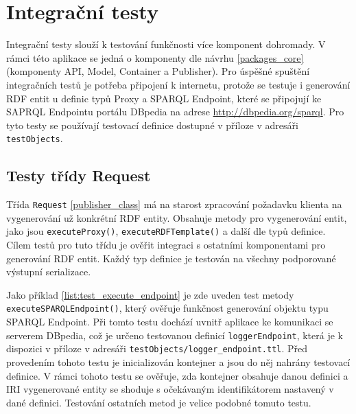 \documentclass[thesis=B,czech]{FITthesis}[2012/06/26]
\begin{document}
    
  
  \section{Integrační testy}
  Integrační testy slouží k testování funkčnosti více komponent dohromady. V rámci této aplikace se jedná o komponenty dle návrhu \ref{packages_core} 
  (komponenty API, Model, Container a Publisher). Pro úspěšné spuštění integračních testů je potřeba připojení k internetu, protože se testuje i generování
  RDF entit u definic typů Proxy a SPARQL Endpoint, které se připojují ke SAPRQL Endpointu portálu DBpedia na adrese \url{http://dbpedia.org/sparql}.
  Pro tyto testy se používají testovací definice dostupné v příloze v adresáři \texttt{testObjects}.
  
  \subsection{Testy třídy Request}
  Třída \texttt{Request} \ref{publisher_class} má na starost zpracování požadavku klienta na vygenerování už konkrétní RDF entity. Obsahuje metody
  pro vygenerování entit, jako jsou
  \texttt{executeProxy()}, \texttt{executeRDFTemplate()} a další dle typů definice. Cílem testů pro tuto třídu je ověřit integraci s ostatními komponentami
  pro generování RDF entit.   
  Každý typ definice je testován na všechny podporované výstupní serializace.
  
  Jako příklad \ref{list:test_execute_endpoint} je zde uveden test metody \texttt{executeSPARQLEndpoint()}, který ověřuje funkčnost generování objektu typu SPARQL Endpoint.
  Při tomto testu dochází uvnitř aplikace ke komunikaci se serverem DBpedia, což je určeno testovanou definicí \texttt{loggerEndpoint}, která je k dispozici v příloze
  v adresáři \texttt{testObjects/logger\_endpoint.ttl}. Před provedením tohoto testu je inicializován kontejner a jsou do něj nahrány testovací definice. 
  V rámci tohoto testu se ověřuje, zda kontejner obsahuje danou definici a IRI vygenerované entity se shoduje s očekávaným identifikátorem nastavený v dané definici.
  Testování ostatních metod je velice podobné tomuto testu.
  
\end{document}
